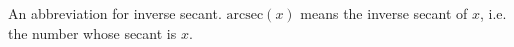 An abbreviation for inverse secant.
$\mathrm{arcsec}(x)$ means the inverse secant of $x$, i.e.
the number whose secant is $x$.